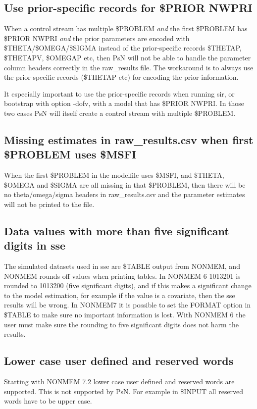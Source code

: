 \subsection{Use prior-specific records for \$PRIOR NWPRI}
When a control stream has multiple \$PROBLEM \emph{and} the first \$PROBLEM has \$PRIOR NWPRI
\emph{and} the prior parameters are encoded with \$THETA/\$OMEGA/\$SIGMA instead of the
prior-specific records \$THETAP, \$THETAPV, \$OMEGAP etc, then PsN will not be able to handle the parameter column
headers correctly in the raw\_results file. The workaround is to always use the prior-specific records 
(\$THETAP etc) for encoding the prior information.

It especially important to use the prior-specific records when running sir,  
or bootstrap with option -dofv,
with a model that has \$PRIOR NWPRI. In
those two cases PsN will itself create a control stream with multiple \$PROBLEM.

\subsection{Missing estimates in raw\_results.csv when first \$PROBLEM uses \$MSFI}
When the first \$PROBLEM in the modelfile uses \$MSFI, and \$THETA, \$OMEGA and \$SIGMA are all missing in that \$PROBLEM, then there will be no theta/omega/sigma headers in raw\_results.csv and the parameter estimates will not be printed to the file.

\subsection{Data values with more than five significant digits in sse}
The simulated datasets used in sse are \$TABLE output from NONMEM, and NONMEM rounds off values when printing tables. In NONMEM 6 1013201 is rounded to 1013200 (five significant digits), and if this makes a significant change to the model estimation, for example if the value is a covariate, then the sse results will be wrong. In NONMEM7 it is possible to set the FORMAT option in \$TABLE to make sure no important information is lost. With NONMEM 6 the user must make sure the rounding to five significant digits does not harm the results.

\subsection{Lower case user defined and reserved words}
Starting with NONMEM 7.2 lower case user defined and reserved words are supported. This is not supported
by PsN. For example in \$INPUT all reserved words have to be upper case.


